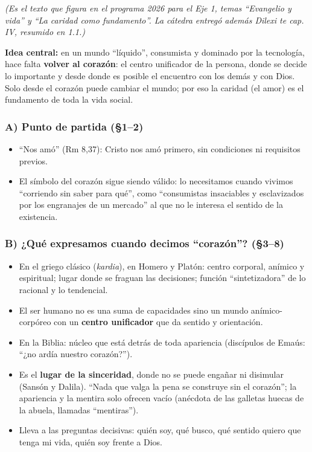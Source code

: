 \documentclass[10pt,a4paper]{article}
\begin{document}
\noindent \textit{(Es el texto que figura en el programa 2026 para el Eje 1, temas ``Evangelio y vida'' y ``La caridad como fundamento''. La cátedra entregó además Dilexi te cap. IV, resumido en 1.1.)}\par\smallskip

\noindent \textbf{Idea central:} en un mundo ``líquido'', consumista y dominado por la tecnología, hace falta \textbf{volver al corazón}: el centro unificador de la persona, donde se decide lo importante y desde donde es posible el encuentro con los demás y con Dios. Solo desde el corazón puede cambiar el mundo; por eso la caridad (el amor) es el fundamento de toda la vida social.\par\smallskip

\subsubsection{A) Punto de partida (\S{}1--2)}
\begin{itemize}
\item ``Nos amó'' (Rm 8,37): Cristo nos amó primero, sin condiciones ni requisitos previos.
\item El símbolo del corazón sigue siendo válido: lo necesitamos cuando vivimos ``corriendo sin saber para qué'', como ``consumistas insaciables y esclavizados por los engranajes de un mercado'' al que no le interesa el sentido de la existencia.
\end{itemize}

\subsubsection{B) ¿Qué expresamos cuando decimos ``corazón''? (\S{}3--8)}
\begin{itemize}
\item En el griego clásico (\textit{kardia}), en Homero y Platón: centro corporal, anímico y espiritual; lugar donde se fraguan las decisiones; función ``sintetizadora'' de lo racional y lo tendencial.
\item El ser humano no es una suma de capacidades sino un mundo anímico-corpóreo con un \textbf{centro unificador} que da sentido y orientación.
\item En la Biblia: núcleo que está detrás de toda apariencia (discípulos de Emaús: ``¿no ardía nuestro corazón?'').
\item Es el \textbf{lugar de la sinceridad}, donde no se puede engañar ni disimular (Sansón y Dalila). ``Nada que valga la pena se construye sin el corazón''; la apariencia y la mentira solo ofrecen vacío (anécdota de las galletas huecas de la abuela, llamadas ``mentiras'').
\item Lleva a las preguntas decisivas: quién soy, qué busco, qué sentido quiero que tenga mi vida, quién soy frente a Dios.
\end{itemize}
\end{document}
